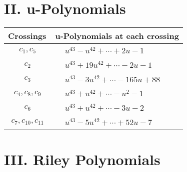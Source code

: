 \documentclass[1p]{elsarticle_modified}
\theoremstyle{definition}
\begin{document}
\newpage\renewcommand{\arraystretch}{1}
\centering \section*{ II. u-Polynomials}
\begin{tabular}{m{50pt}|m{274pt}}
Crossings & \hspace{64pt}u-Polynomials at each crossing \\
\hline $$\begin{aligned}c_{1},c_{5}\end{aligned}$$&$\begin{aligned}
&u^{43}- u^{42}+\cdots+2 u-1
\end{aligned}$\\
\hline $$\begin{aligned}c_{2}\end{aligned}$$&$\begin{aligned}
&u^{43}+19 u^{42}+\cdots-2 u-1
\end{aligned}$\\
\hline $$\begin{aligned}c_{3}\end{aligned}$$&$\begin{aligned}
&u^{43}-3 u^{42}+\cdots-165 u+88
\end{aligned}$\\
\hline $$\begin{aligned}c_{4},c_{8},c_{9}\end{aligned}$$&$\begin{aligned}
&u^{43}+u^{42}+\cdots- u^2-1
\end{aligned}$\\
\hline $$\begin{aligned}c_{6}\end{aligned}$$&$\begin{aligned}
&u^{43}+u^{42}+\cdots-3 u-2
\end{aligned}$\\
\hline $$\begin{aligned}c_{7},c_{10},c_{11}\end{aligned}$$&$\begin{aligned}
&u^{43}-5 u^{42}+\cdots+52 u-7
\end{aligned}$\\
\hline
\end{tabular}\newpage\renewcommand{\arraystretch}{1}
\centering \section*{ III. Riley Polynomials}
\end{document}
